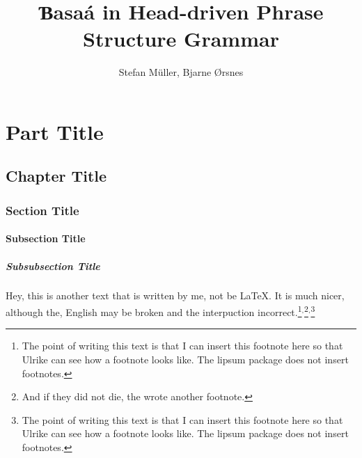 \documentclass[ number=45
			   ,series=eotms
			   ,output=printondemand %
			  ]{langsci}
\title{Ɓasaá in \newlineCover Head-driven \newlineCover\newlineSpine Phrase Structure Grammar}
\author{Stefan Müller, \newlineCover Bjarne Ørsnes}
\begin{document}
               
        
                                    
                           
\maketitle                

\tableofcontents      
        
\part{Part Title}	               
\chapter{Chapter Title}
\section{Section Title}
\subsection{Subsection Title}
\subsubsection{Subsubsection Title}       
                                                   

Hey, this is another text that is written by me, not be \LaTeX{}. It is much nicer, although the,
English may be broken and the interpuction incorrect.\footnote{
  The point of writing this text is that I can insert this footnote here so that Ulrike can see how
  a footnote looks like. The lipsum package does not insert footnotes.
}$^,$\footnote{
  And if they did not die, the wrote another footnote.
}$^,$\footnote{
  The point of writing this text is that I can insert this footnote here so that Ulrike can see how
  a footnote looks like. The lipsum package does not insert footnotes.
}


\lipsum 
\lipsum[3-10]  

 

\newpage

\layout
                              
\end{document}
